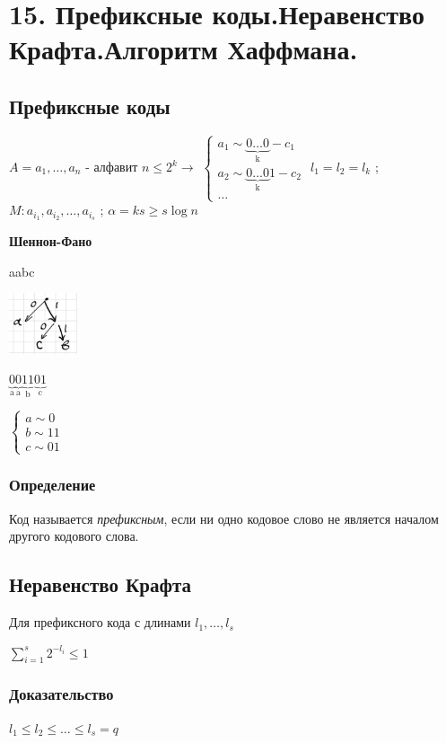 \documentclass[12pt]{article}
\begin{document}
\section{15. Префиксные коды.Неравенство Крафта.Алгоритм Хаффмана.}
\subsection{Префиксные коды}
$A = {a_1, \dots, a_n}$ - алфавит $ n \leq2^k\rightarrow$
$\begin{cases}
        a_1  \sim \underbrace{0\dots0}_{\text{k}} - c_1  \\
        a_2  \sim \underbrace{0\dots0}_{\text{k}}1 - c_2 \\
        \dots
    \end{cases}$
\newline$l_1=l_2=l_k$ ; $M:a_{i_1},a_{i_2},\dots,a_{i_s}$ ; $\alpha=ks\geq s\log{n}$

\textbf{Шеннон-Фано}

aabc

\includegraphics[width=20mm]{images/tree1.png}

$\underbrace{0}_{\text{a}}\underbrace{0}_{\text{a}}\underbrace{11}_{\text{b}}\underbrace{01}_{\text{c}}$

$\begin{cases}
        a  \sim 0  \\
        b  \sim 11 \\
        c \sim 01
    \end{cases}$

\subsubsection{Определение}
Код называется \textit{префиксным}, если ни одно кодовое слово не является началом другого кодового слова.

\subsection{Неравенство Крафта}
Для префиксного кода с длинами $l_1,\dots,l_s$

$\sum\limits_{i=1}^s 2^{-l_i} \leq 1$
\subsubsection{Доказательство}
$l_1\leq l_2 \leq \dots \leq l_s=q$
\end{document}

